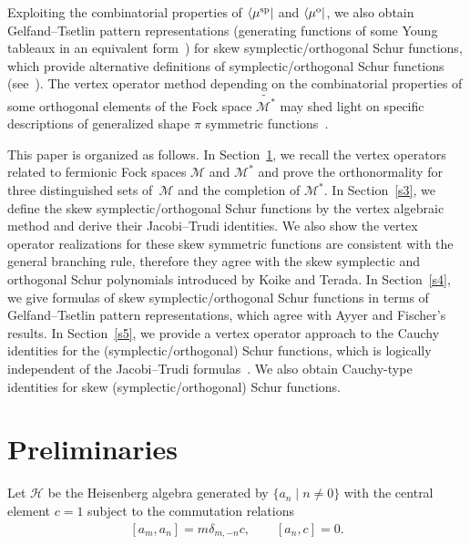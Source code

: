 \documentclass[10pt,a4paper]{amsart}
\numberwithin{equation}{section}
\begin{document}
Exploiting the combinatorial properties of $\langle\mu^{\rm sp}|$ and $\langle\mu^{\rm o}|$, we also obtain Gelfand--Tsetlin pattern representations (generating
functions of some Young tableaux in an equivalent form~\cite{Sta1999}) for skew symplectic/orthogonal Schur functions, which provide alternative definitions of
symplectic/orthogonal Schur functions (see~\cite{AF2020}). The vertex operator method depending on the combinatorial properties of some orthogonal elements of the Fock space $\widetilde{\mathcal{M}^*}$ may shed light on specific descriptions of generalized shape $\pi$ symmetric functions~\cite{FJK2010}.

This paper is organized as follows. In Section~\ref{s2}, we recall the vertex operators related to fermionic Fock spaces $\mathcal{M}$ and $\mathcal{M}^*$
and prove the orthonormality for three distinguished sets of~$\mathcal{M}$ and the completion of $\mathcal{M}^*$. In Section~\ref{s3}, we define the skew symplectic/orthogonal Schur functions by the vertex algebraic method and derive their Jacobi--Trudi identities. We also show the vertex operator realizations for these skew symmetric functions are consistent with the general branching rule, therefore they agree with the skew symplectic and orthogonal Schur polynomials introduced by Koike and Terada. In Section~\ref{s4}, we give formulas of skew symplectic/orthogonal Schur functions in terms of Gelfand--Tsetlin pattern representations, which agree with Ayyer and Fischer's results. In Section~\ref{s5}, we provide a vertex operator approach to the Cauchy identities for the (symplectic/orthogonal) Schur functions, which is logically independent of the
Jacobi--Trudi formulas~\cite{JR2016}. We also obtain Cauchy-type identities for skew (symplectic/orthogonal) Schur functions.


\section{Preliminaries}\label{s2}

Let $\mathcal{H}$ be the Heisenberg algebra generated by $\{a_n\mid n\neq 0\}$ with the central element $c=1$ subject to the commutation relations \cite{FK1980}
\begin{align}\label{e:he1}
[a_m,a_n]=m\delta_{m,-n}c,\qquad [a_n,c]=0.
\end{align}
\end{document}

